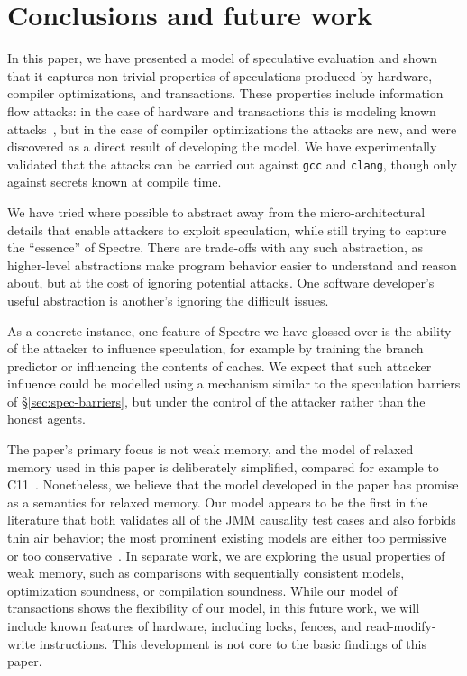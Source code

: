 \section{Conclusions and future work}

In this paper, we have presented a model of speculative evaluation and
shown that it captures non-trivial properties of speculations produced
by hardware, compiler optimizations, and transactions. These properties
include information flow attacks: in the case of hardware and transactions
this is modeling known attacks~\cite{DBLP:journals/corr/abs-1801-01203,DBLP:conf/uss/DisselkoenKPT17},
but in the case of compiler optimizations the attacks are new, and were
discovered as a direct result of developing the model. We have experimentally
validated that the attacks can be carried out against \verb|gcc| and \verb|clang|,
though only against secrets known at compile time.

We have tried where possible to abstract away from the
micro-architectural details that enable attackers to exploit
speculation, while still trying to capture the ``essence'' of
Spectre. There are trade-offs with any such abstraction, as
higher-level abstractions make program behavior easier to understand
and reason about, but at the cost of ignoring potential attacks. One
software developer's useful abstraction is another's ignoring the
difficult issues.

As a concrete instance, one feature of Spectre we have glossed over is
the ability of the attacker to influence speculation, for example by
training the branch predictor or influencing the contents of caches.
We expect that such attacker influence could be modelled using a
mechanism similar to the speculation barriers of \S\ref{sec:spec-barriers},
but under the control of the attacker rather than the honest agents.

The paper's primary focus is not weak memory, and the model of relaxed
memory used in this paper is deliberately simplified, compared for
example to
C11~\cite{Boehm:2008:FCC:1375581.1375591,Batty:2011:MCC:1926385.1926394}. Nonetheless,
we believe that the model developed in the paper has promise as a
semantics for relaxed memory. Our model appears to be the first in the
literature that both validates all of the JMM causality test cases and
also forbids thin air behavior; the most prominent existing models are
either too permissive~\cite{Manson:2005:JMM:1047659.1040336,
  Jagadeesan:2010:GOS:2175486.2175503,Kang-promising-2017} or
too conservative~\cite{DBLP:conf/lics/JeffreyR16}.  In separate work,
we are exploring the usual properties of weak memory, such as
comparisons with sequentially consistent models,
optimization soundness, or compilation soundness.  While our model of
transactions shows the flexibility of our model, in this future work,
we will include known features of hardware, including locks, fences,
and read-modify-write instructions.  This development is not core to
the basic findings of this paper.



